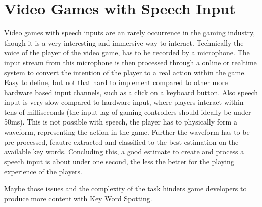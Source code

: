 
\section{Video Games with Speech Input}
Video games with speech inputs are an rarely occurrence in the gaming industry, though it is a very interesting and immersive way to interact.
Technically the voice of the player of the video game, has to be recorded by a microphone.
The input stream from this microphone is then processed through a online or realtime system to convert the intention of the player to a real action within the game.
Easy to define, but not that hard to implement compared to other more hardware based input channels, such as a click on a keyboard button.
Also speech input is very slow compared to hardware input, where players interact within tens of milliseconds (the input lag of gaming controllers should ideally be under 50ms).
This is not possible with speech, the player has to physically form a waveform, representing the action in the game.
Further the waveform has to be pre-processed, feautre extracted and classified to the best estimation on the available key words.
Concluding this, a good estimate to create and process a speech input is about under one second, the less the better for the playing experience of the players.

Maybe those issues and the complexity of the task hinders game developers to produce more content with Key Word Spotting.


